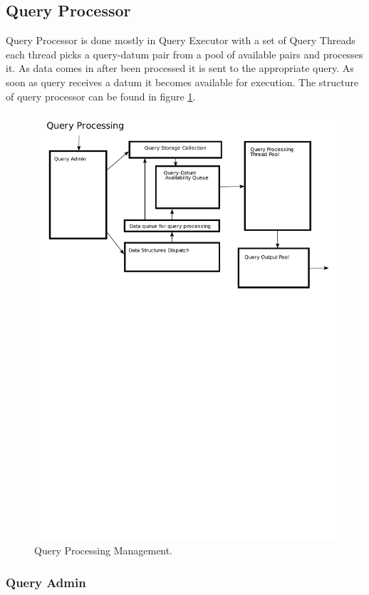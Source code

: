 \documentclass[14pt]{article}
\begin{document}
\subsection{Query Processor}

Query Processor is done mostly in Query Executor with a set of Query Threads each thread picks a query-datum pair from a pool of available pairs and processes it. As data comes in after been processed it is sent to the appropriate query. As soon as query receives a datum it becomes available for execution. The structure of query processor can be found in figure \ref{QueryProcessingPic}.

\begin{figure}
  \includegraphics[width=5.00in]{../figures/QueryProcessing.pdf}
  \caption{Query Processing Management.}
  \label{QueryProcessingPic}
\end{figure}

\subsubsection{Query Admin}
\end{document}
